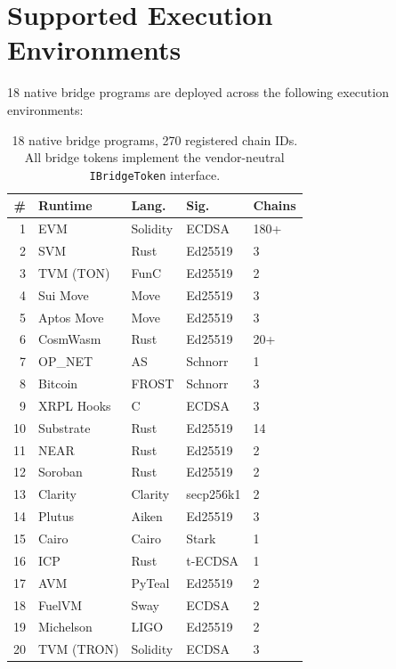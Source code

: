 \section{Supported Execution Environments}

\label{sec:chains}

18 native bridge programs are deployed across the following execution environments:

\begin{table}[h]
\centering
\scriptsize
\begin{tabular}{rllll}
\toprule
\textbf{\#} & \textbf{Runtime} & \textbf{Lang.} & \textbf{Sig.} & \textbf{Chains} \\
\midrule
1 & EVM & Solidity & ECDSA & 180+ \\
2 & SVM & Rust & Ed25519 & 3 \\
3 & TVM (TON) & FunC & Ed25519 & 2 \\
4 & Sui Move & Move & Ed25519 & 3 \\
5 & Aptos Move & Move & Ed25519 & 3 \\
6 & CosmWasm & Rust & Ed25519 & 20+ \\
7 & OP\_NET & AS & Schnorr & 1 \\
8 & Bitcoin & FROST & Schnorr & 3 \\
9 & XRPL Hooks & C & ECDSA & 3 \\
10 & Substrate & Rust & Ed25519 & 14 \\
11 & NEAR & Rust & Ed25519 & 2 \\
12 & Soroban & Rust & Ed25519 & 2 \\
13 & Clarity & Clarity & secp256k1 & 2 \\
14 & Plutus & Aiken & Ed25519 & 3 \\
15 & Cairo & Cairo & Stark & 1 \\
16 & ICP & Rust & t-ECDSA & 1 \\
17 & AVM & PyTeal & Ed25519 & 2 \\
18 & FuelVM & Sway & ECDSA & 2 \\
19 & Michelson & LIGO & Ed25519 & 2 \\
20 & TVM (TRON) & Solidity & ECDSA & 3 \\
\bottomrule
\end{tabular}
\caption{18 native bridge programs, 270 registered chain IDs. All bridge tokens implement the vendor-neutral \texttt{IBridgeToken} interface.}
\label{tab:runtimes}
\end{table}

